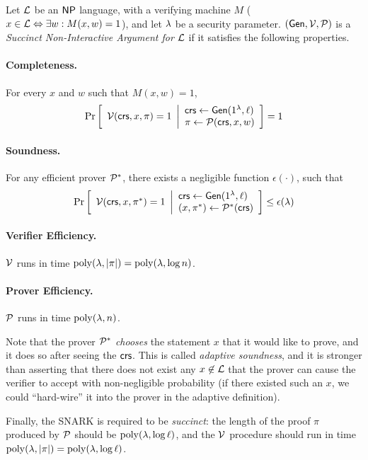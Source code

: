 \begin{definition} \label{def:snarg}
Let $\mathcal{L}$ be an ${\mathsf{NP}}$ language, with a verifying machine $M$ ($x\in \mathcal{L} \Leftrightarrow \exists w: M(x,w)=1$), and let $\lambda$ be a security parameter. $(\mathsf{Gen}, \mathcal{V}, \mathcal{P})$ is a \emph{Succinct Non-Interactive Argument for $\mathcal{L}$}
if it satisfies the following properties.
\paragraph{Completeness.} For every $x$ and $w$ such that $M(x,w)=1$,
    \begin{gather*}
        \underset{}{\text{Pr}}\left [ 
        \begin{array}{ll}
        \mathcal{V}(\mathsf{crs}, x, \pi) = 1
        \end{array}
        \middle\vert
        \begin{array}{ll}
        \mathit{ \mathsf{crs} } \leftarrow \mathsf{Gen}(1^\lambda, \ell) \\
        \pi \leftarrow \mathcal{P}(\mathit{ \mathsf{crs} }, x, w) \\
        \end{array}
        \right ] = 1
    \end{gather*}
\paragraph{Soundness.} For any efficient prover $\mathcal{P}^*$, there exists a negligible function $\epsilon(\cdot)$, such that \begin{gather*}
        \underset{}{\text{Pr}}\left [
        \begin{array}{ll}
        \mathcal{V}(\mathit{ \mathsf{crs} }, x, \pi^*) = 1
        \end{array}
        \middle\vert
        \begin{array}{ll}
        \mathit{ \mathsf{crs} } \leftarrow \mathsf{Gen}(1^\lambda, \ell) \\
        (x, \pi^*) \leftarrow \mathcal{P}^*(\mathit{ \mathsf{crs} }) \\
        \end{array}
        \right ] \leq \epsilon(\lambda)
    \end{gather*}
\paragraph{Verifier Efficiency.} $\mathcal{V}$ runs in time $\operatorname{poly}(\lambda, |\pi|) = \operatorname{poly}(\lambda, \log n)$.
\paragraph{Prover Efficiency.} $\mathcal{P}$ runs in time $\operatorname{poly}(\lambda, n)$.

\end{definition}
Note that the prover $\mathcal{P}^*$ \emph{chooses} the statement $x$ that
it would like to prove, and it does so after seeing the $\mathsf{crs}$.
This is called \emph{adaptive soundness}, and it is stronger than asserting that there does not exist any $x \not \in \mathcal{L}$
that the prover can cause the verifier to accept with non-negligible probability
(if there existed such an $x$, we could ``hard-wire''
it into the prover in the adaptive definition).

Finally, the SNARK is required to be \emph{succinct}: the length of the proof $\pi$ produced by $\mathcal{P}$ should be $\operatorname{poly}(\lambda, \log \ell)$,
and the $\mathcal{V}$ procedure should run in time $\operatorname{poly}(\lambda, |\pi|) = \operatorname{poly}(\lambda, \log \ell)$.
